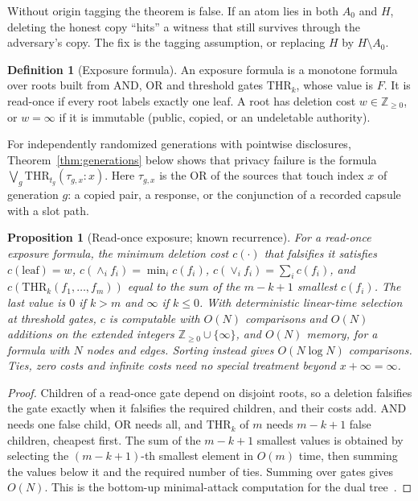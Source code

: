 \documentclass[pdflatex,sn-mathphys-num]{sn-jnl}
\theoremstyle{plain}
\newtheorem{proposition}[theorem]{Proposition}
\theoremstyle{definition}
\newtheorem{definition}[theorem]{Definition}
\begin{document}
Without origin tagging the theorem is false. If an atom lies in both $A_0$ and $H$, deleting the honest copy ``hits'' a witness that still survives through the adversary's copy. The fix is the tagging assumption, or replacing $H$ by $H\setminus A_0$.

\begin{definition}[Exposure formula]
An exposure formula is a monotone formula over roots built from AND, OR and threshold gates $\mathrm{THR}_k$, whose value is $F$. It is read-once if every root labels exactly one leaf. A root has deletion cost $w\in\mathbb{Z}_{\ge0}$, or $w=\infty$ if it is immutable (public, copied, or an undeletable authority).
\end{definition}

For independently randomized generations with pointwise disclosures, Theorem~\ref{thm:generations} below shows that privacy failure is the formula $\bigvee_g\mathrm{THR}_{t_g}(\tau_{g,x}:x)$. Here $\tau_{g,x}$ is the OR of the sources that touch index $x$ of generation $g$: a copied pair, a response, or the conjunction of a recorded capsule with a slot path.

\begin{proposition}[Read-once exposure; known recurrence]\label{prop:readonce}
For a read-once exposure formula, the minimum deletion cost $c(\cdot)$ that falsifies it satisfies $c(\text{leaf})=w$, $c(\wedge_i f_i)=\min_i c(f_i)$, $c(\vee_i f_i)=\sum_i c(f_i)$, and $c(\mathrm{THR}_k(f_1,\dots,f_m))$ equal to the sum of the $m-k+1$ smallest $c(f_i)$. The last value is $0$ if $k>m$ and $\infty$ if $k\le0$. With deterministic linear-time selection~\cite{blum1973} at threshold gates, $c$ is computable with $O(N)$ comparisons and $O(N)$ additions on the extended integers $\mathbb{Z}_{\ge0}\cup\{\infty\}$, and $O(N)$ memory, for a formula with $N$ nodes and edges. Sorting instead gives $O(N\log N)$ comparisons. Ties, zero costs and infinite costs need no special treatment beyond $x+\infty=\infty$.
\end{proposition}
\begin{proof}
Children of a read-once gate depend on disjoint roots, so a deletion falsifies the gate exactly when it falsifies the required children, and their costs add. AND needs one false child, OR needs all, and $\mathrm{THR}_k$ of $m$ needs $m-k+1$ false children, cheapest first. The sum of the $m-k+1$ smallest values is obtained by selecting the $(m-k+1)$-th smallest element in $O(m)$ time, then summing the values below it and the required number of ties. Summing over gates gives $O(N)$. This is the bottom-up minimal-attack computation for the dual tree~\cite{mauw2005,lopuhaa2022}.
\end{proof}
\end{document}
